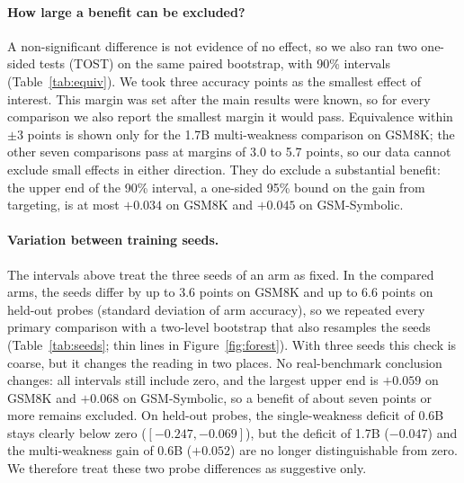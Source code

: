 \documentclass[11pt]{article}
\begin{document}
\paragraph{How large a benefit can be excluded?} A non-significant difference is not evidence of no effect, so we
also ran two one-sided tests (TOST) on the same paired bootstrap, with 90\% intervals (Table~\ref{tab:equiv}). We
took three accuracy points as the smallest effect of interest. This margin was set after the main results were known,
so for every comparison we also report the smallest margin it would pass. Equivalence within $\pm3$ points is shown
only for the 1.7B multi-weakness comparison on GSM8K; the other seven comparisons pass at margins of 3.0 to 5.7 points,
so our data cannot exclude small effects in either direction. They do exclude a substantial benefit: the upper end of
the 90\% interval, a one-sided 95\% bound on the gain from targeting, is at most $+0.034$ on GSM8K and $+0.045$ on
GSM-Symbolic.

\paragraph{Variation between training seeds.} The intervals above treat the three seeds of an arm as fixed. In the compared arms, the seeds
differ by up to 3.6 points on GSM8K and up to 6.6 points on held-out probes (standard deviation of arm accuracy), so we
repeated every primary comparison with a two-level bootstrap that also resamples the seeds (Table~\ref{tab:seeds}; thin
lines in Figure~\ref{fig:forest}). With three seeds this check is coarse, but it changes the reading in two places. No
real-benchmark conclusion changes: all intervals still include zero, and the largest upper end is $+0.059$ on GSM8K and
$+0.068$ on GSM-Symbolic, so a benefit of about seven points or more remains excluded. On held-out probes, the
single-weakness deficit of 0.6B stays clearly below zero ($[-0.247, -0.069]$), but the deficit of 1.7B ($-0.047$) and
the multi-weakness gain of 0.6B ($+0.052$) are no longer distinguishable from zero. We therefore treat these two probe
differences as suggestive only.
\end{document}
